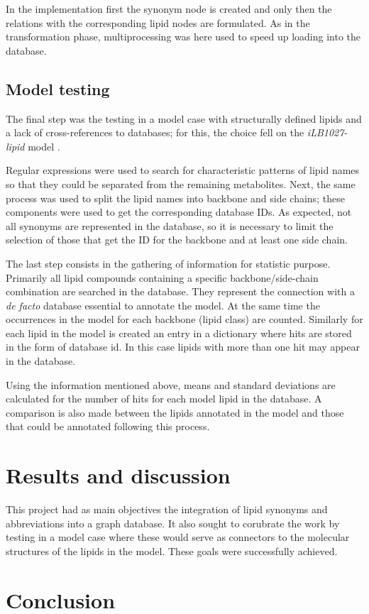 \documentclass{llncs}
\begin{document}
In the implementation first the synonym node is created and only then the relations with the corresponding lipid nodes are formulated.
As in the transformation phase, multiprocessing was here used to speed up loading into the database.

\subsection{Model testing}

The final step was the testing in a model case with structurally defined lipids and a lack of cross-references to databases; for this, the choice fell on the \textit{iLB1027-lipid} model \cite{Levering2016}.

Regular expressions were used to search for characteristic patterns of lipid names so that they could be separated from the remaining metabolites.
Next, the same process was used to split the lipid names into backbone and side chains; these components were used to get the corresponding database IDs. 
As expected, not all synonyms are represented in the database, so it is necessary to limit the selection of those that get the ID for the backbone and at least one side chain.


The last step consists in the gathering of information for statistic purpose. Primarily all lipid compounds containing a specific backbone/side-chain combination are searched in the database. They represent the connection with a \textit{de facto} database essential to annotate the model. At the same time the occurrences in the model for each backbone (lipid class) are counted. Similarly for each lipid in the model is created an entry in a dictionary where hits are stored in the form of database id. In this case lipids with more than one hit may appear in the database. 

Using the information mentioned above, means and standard deviations are calculated for the number of hits for each model lipid in the database. A comparison is also made between the lipids annotated in the model and those that could be annotated following this process. 





\section{Results and discussion}
This project had as main objectives the integration of lipid synonyms and abbreviations into a graph database. It also sought to corubrate the work by testing in a model case where these would serve as connectors to the molecular structures of the lipids in the model.
These goals were successfully achieved.



\section{Conclusion}





\end{document}

